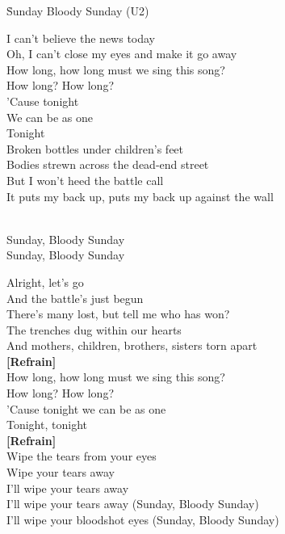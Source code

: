\documentclass{novel}
\begin{document}
\newpage
\normalsize
\h*{Sunday Bloody Sunday (U2)}
\begin{multicols}{2}
I can't believe the news today \\
Oh, I can't close my eyes and make it go away \\
How long, how long must we sing this song? \\
How long? How long? \\
'Cause tonight \\
We can be as one \\
Tonight \\

Broken bottles under children's feet \\
Bodies strewn across the dead-end street \\
But I won't heed the battle call \\
It puts my back up, puts my back up against the wall \\

\begin{bfseries}
[Refrain:]\\
Sunday, Bloody Sunday \\
Sunday, Bloody Sunday \\
\end{bfseries}

Alright, let's go \\
And the battle's just begun \\
There's many lost, but tell me who has won? \\
The trenches dug within our hearts \\
And mothers, children, brothers, sisters torn apart \\

\textbf{[Refrain]}\\

How long, how long must we sing this song? \\
How long? How long? \\
'Cause tonight we can be as one \\
Tonight, tonight \\

\textbf{[Refrain]}\\

Wipe the tears from your eyes \\
Wipe your tears away \\
I'll wipe your tears away \\
I'll wipe your tears away (Sunday, Bloody Sunday) \\
I'll wipe your bloodshot eyes (Sunday, Bloody Sunday) \\


\end{multicols}
\end{document}
